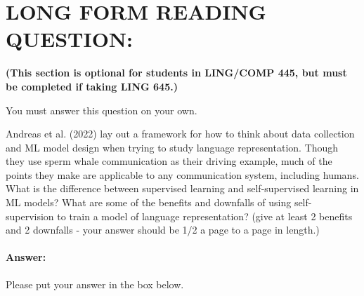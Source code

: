 \documentclass[10pt]{article}
\newenvironment{AnswerBox}{\begin{mdframed}[style=simple]}{\end{mdframed}}
\begin{document}
\newpage
\section*{LONG FORM READING QUESTION:} 
\textbf{(This section is optional for students in LING/COMP 445, but must be completed if taking LING 645.)}

You must answer this question on your own.

Andreas et al. (2022) lay out a framework for how to think about data collection and ML model design when trying to study language representation. Though they use sperm whale communication as their driving example, much of the points they make are applicable to any communication system, including humans. What is the difference between supervised learning and self-supervised learning in ML models? What are some of the benefits and downfalls of using self-supervision to train a model of language representation? (give at least 2 benefits and 2 downfalls - your answer should be 1/2 a page to a page in length.)


\paragraph{Answer:} Please put your answer in the box below.

\begin{AnswerBox}%


\end{AnswerBox}%
\end{document}
